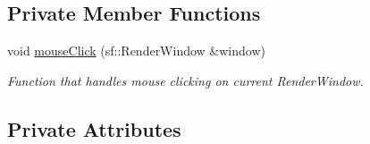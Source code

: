 \subsection*{Private Member Functions}
\begin{DoxyCompactItemize}
\item 
void \hyperlink{classDifficulty__Singleplayer__State_a9c25ab4675b3af15ab3077e9c757e1e1}{mouse\+Click} (sf\+::\+Render\+Window \&window)
\begin{DoxyCompactList}\small\item\em Function that handles mouse clicking on current Render\+Window. \end{DoxyCompactList}\end{DoxyCompactItemize}
\subsection*{Private Attributes}
